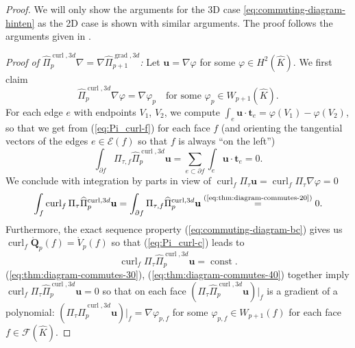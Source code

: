 \documentclass{article}
\newcommand{\hatPicurlcom}{\widehat \Pi^{\operatorname*{curl},3d}_p}
\newcommand{\hatPigradcom}{\widehat\Pi^{\operatorname*{grad},3d}_{p+1}}
\begin{document}
\begin{proof}
We will only show
the arguments for the 3D case \eqref{eq:commuting-diagram-hinten} as the 2D case 
is shown with similar arguments.
The proof follows the arguments given in \cite{demkowicz08}.  

\emph{Proof of 
$ \hatPicurlcom\nabla= \nabla\hatPigradcom $:} 
Let $\mathbf{u}=\nabla\varphi$ for
some $\varphi\in H^{2}(\widehat{K})$. We first claim 
\begin{equation}
\hatPicurlcom\nabla\varphi=\nabla\varphi_{p}%
\quad\text{for some }\varphi_{p}\in W_{p+1}(\widehat{K}).
\label{eq:thm:diagram-commutes-10}%
\end{equation}
For each edge $e$ with endpoints $V_{1}$, $V_{2}$, we compute $\int%
_{e}\mathbf{u}\cdot\mathbf{t}_{e}=\varphi(V_{1})-\varphi(V_{2})$, so that we
get from (\ref{eq:Pi_curl-f}) for each face $f$ 
(and orienting the tangential vectors 
of the edges $e \in {\mathcal{E}}(f)$ so that $f$ is always ``on the left'')
\begin{equation}
\int_{\partial f}\Pi_{\tau,f}\hatPicurlcom\mathbf{u}=\sum_{e\subset\partial f}\int_{e}\mathbf{u}\cdot\mathbf{t}%
_{e}=0. \label{eq:thm:diagram-commutes-20}%
\end{equation}
We conclude with integration by parts in view of $\operatorname{curl}_{f}%
\Pi_{\tau}\mathbf{u}=\operatorname*{curl}_{f}\Pi_{\tau}\nabla\varphi=0$
\begin{equation}
\int_{f}\operatorname{curl}_{f}\Pi_{\tau}\hatPicurlcom\mathbf{u}=\int_{\partial f}\Pi_{\tau,f}\hatPicurlcom\mathbf{u}%
\overset{\text{(\ref{eq:thm:diagram-commutes-20})}}{=}0.
\label{eq:thm:diagram-commutes-30}%
\end{equation}
Furthermore, the exact sequence property (\ref{eq:commuting-diagram-bc}) gives
us $\operatorname{curl}_{f}\mathring{\mathbf{Q}}_{p}(f)=\mathring{V}_{p}(f)$
so that (\ref{eq:Pi_curl-c}) leads to 
\begin{equation}
\operatorname{curl}_{f}\Pi_{\tau}\hatPicurlcom\mathbf{u}=\operatorname*{const}. \label{eq:thm:diagram-commutes-40}%
\end{equation}
(\ref{eq:thm:diagram-commutes-30}), (\ref{eq:thm:diagram-commutes-40})
together imply $\operatorname*{curl}_{f}\Pi_{\tau}\hatPicurlcom\mathbf{u}=0$ so that on each face $(\Pi_{\tau
}\hatPicurlcom\mathbf{u})|_{f}$ is a gradient of
a polynomial: $(\Pi_{\tau}\hatPicurlcom\mathbf{u})|_{f}=\nabla\varphi_{p,f}$ for some $\varphi_{p,f}\in W_{p+1}(f)$
for each face $f\in{\mathcal{F}}(\widehat{K})$.


\end{proof}
\end{document}
